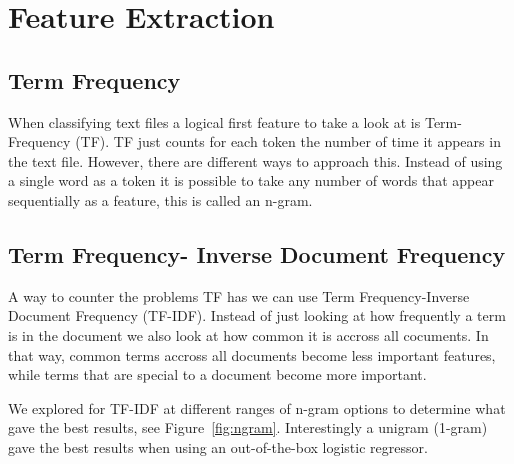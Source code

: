\section{Feature Extraction}

\subsection{Term Frequency}

When classifying text files a logical first feature to take a look at is Term-Frequency (TF).
TF just counts for each token the number of time it appears in the text file.
However, there are different ways to approach this. 
Instead of using a single word as a token it is possible to take any number of words that appear sequentially  as a feature, this is called an n-gram.

\subsection{Term Frequency- Inverse Document Frequency}

A way to counter the problems TF has we can use Term Frequency-Inverse Document Frequency (TF-IDF).
Instead of just looking at how frequently a term is in the document we also look at how common it is accross all cocuments.
In that way, common terms accross all documents become less important features, while terms that are special to a document become more important.

We explored for TF-IDF at different ranges of n-gram options to determine what gave the best results, see Figure~\ref{fig:ngram}.
Interestingly a unigram (1-gram) gave the best results when using an out-of-the-box logistic regressor. 

